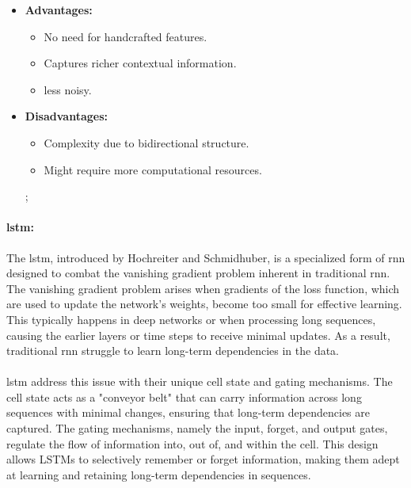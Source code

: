         \begin{itemize}
            \item \textbf{Advantages:} 
            \begin{itemize}
                \item No need for handcrafted features.
                \item Captures richer contextual information.
                \item less noisy.
            \end{itemize}
            \item \textbf{Disadvantages:} 
            \begin{itemize}
                \item Complexity due to bidirectional structure.
                \item Might require more computational resources.
            \end{itemize}; 
        \end{itemize}

        \paragraph{\acrfull{lstm}\cite{hochreiter_long_1997}:}The \acrshort{lstm}, introduced by Hochreiter and Schmidhuber, is a specialized form of \acrshort{rnn} designed to combat the vanishing gradient problem inherent in traditional \acrshort{rnn}. The vanishing gradient problem arises when gradients of the loss function, which are used to update the network's weights, become too small for effective learning. This typically happens in deep networks or when processing long sequences, causing the earlier layers or time steps to receive minimal updates. As a result, traditional \acrshort{rnn} struggle to learn long-term dependencies in the data.

        \paragraph{}\acrshort{lstm} address this issue with their unique cell state and gating mechanisms. The cell state acts as a "conveyor belt" that can carry information across long sequences with minimal changes, ensuring that long-term dependencies are captured. The gating mechanisms, namely the input, forget, and output gates, regulate the flow of information into, out of, and within the cell. This design allows LSTMs to selectively remember or forget information, making them adept at learning and retaining long-term dependencies in sequences.

